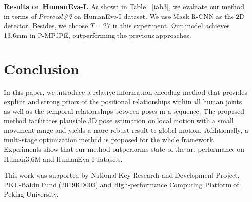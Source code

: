 \documentclass[sigconf]{acmart}
\begin{document}
\textbf{Results on HumanEva-I.} As shown in Table ~\ref{tab3}, we evaluate our method in terms of \textit{Protocol\#2} on HumanEva-I dataset. We use Mask R-CNN \cite{he2017mask} as the 2D detector. Besides, we choose $T=27$ in this experiment. Our model achieves 13.6mm in P-MPJPE, outperforming the previous approaches.



\section{Conclusion}
In this paper, we introduce a relative information encoding method that provides explicit and strong priors of the positional relationships within all human joints as well as the temporal relationships between poses in a sequence. The proposed method facilitates plausible 3D pose estimation on local motion with a small movement range and yields a more robust result to global motion. Additionally, a multi-stage optimization method is proposed for the whole framework. Experiments show that our method outperforms state-of-the-art performance on Human3.6M and HumanEva-I datasets.

\begin{acks}
This work was supported by National Key Research and Development Project, PKU-Baidu Fund (2019BD003) and High-performance Computing Platform of Peking University.
\end{acks}
\end{document}
